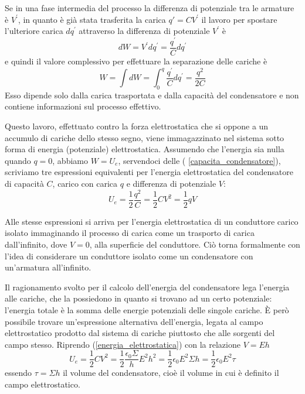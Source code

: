 \documentclass[class=book, crop=false, oneside, 12pt]{standalone}
\begin{document}
Se in una fase intermedia del processo la differenza di potenziale tra le armature è \(V^{\prime}\), in quanto è già stata trasferita la carica \(q' = C V^{\prime}\) il lavoro per spostare l'ulteriore carica \(dq^{\prime}\) attraverso la differenza di potenziale \(V^{\prime}\) è
\begin{equation*}
    d W = V^{\prime} d q^{\prime} = \frac{q^{\prime}}{C} d q^{\prime}
\end{equation*}
e quindi il valore complessivo per effettuare la separazione delle cariche è
\begin{equation*}
    W = \int dW = \int_0^q \frac{q^{\prime}}{C}d q^{\prime} = \frac{q^2}{2 C}
\end{equation*}
Esso dipende solo dalla carica trasportata e dalla capacità del condensatore e non contiene informazioni sul processo effettivo.

Questo lavoro, effettuato contro la forza elettrostatica che si oppone a un accumulo di cariche dello stesso segno, viene immagazzinato nel sistema sotto forma di energia (potenziale) elettrostatica. 
Assumendo che l'energia sia nulla quando \(q = 0\), abbiamo \(W = U_e\), servendoci delle ( \ref{capacita_condensatore}), scriviamo tre espressioni equivalenti per l'energia elettrostatica del condensatore di capacità \(C\), carico con carica \(q\) e differenza di potenziale \(V\):
\begin{equation} \label{energia_elettrostatica}
    U_e = \frac{1}{2} \frac{q^2}{C} = \frac{1}{2} C V^2 = \frac{1}{2} q V
\end{equation} 

Alle stesse espressioni si arriva per l'energia elettrostatica di un conduttore carico isolato immaginando il processo di carica come un trasporto di carica dall'infinito, dove \(V = 0\), alla superficie del conduttore. 
Ciò torna formalmente con l'idea di considerare un conduttore isolato come un condensatore con un'armatura all'infinito.

Il ragionamento svolto per il calcolo dell'energia del condensatore lega l'energia alle cariche, che la possiedono in quanto si trovano ad un certo potenziale: l'energia totale è la somma delle energie potenziali delle singole cariche. 
È però possibile trovare un'espressione alternativa dell'energia, legata al campo elettrostatico prodotto dal sistema di cariche piuttosto che alle sorgenti del campo stesso.
Riprendo (\ref{energia_elettrostatica}) con la relazione \(V =Eh\)
\begin{equation*}
    U_e = \frac{1}{2} C V^2 = \frac{1}{2} \frac{\epsilon_0 \Sigma}{h} E^2 h^2 = \frac{1}{2} \epsilon_0 E^2 \Sigma h = \frac{1}{2} \epsilon_0 E^2 \tau
\end{equation*}
essendo \(\tau = \Sigma h\) il volume del condensatore, cioè il volume in cui è definito il campo elettrostatico.
\end{document}
